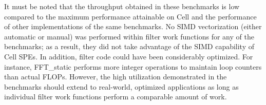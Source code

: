 It must be noted that the throughput obtained in these benchmarks is low
compared to the maximum performance attainable on Cell and the performance of other
implementations of the same benchmarks.
No SIMD vectorization (either automatic or manual) was performed within
filter work functions for any of the benchmarks;
as a result, they did not take advantage of the SIMD capability of Cell SPEs.
In addition, filter code could have been considerably optimized. For instance,
\textsf{FFT\_static} performs more integer operations to maintain loop counters than actual FLOPs.
However, the high utilization demonstrated in the benchmarks should extend to
real-world, optimized applications as long as individual filter work functions
perform a comparable amount of work.
